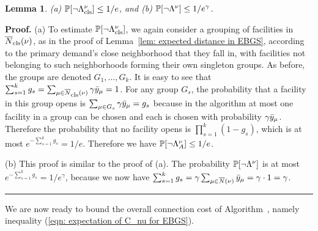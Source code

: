 \documentclass[oneside,final]{ucr}
\newtheorem{lemma}[theorem]{Lemma}
\newenvironment{proof}[1][Proof]{\textbf{#1.} }{\ \rule{0.5em}{0.5em}}
\begin{document}
\begin{lemma}\label{lem: close and far neighbor probability}
{\rm (a)} $\mathbb{P}[\neg\Lambda^\nu_{{\mbox{\scriptsize\rm cls}}}] \le 1/e$, and
{\rm (b)} $\mathbb{P}[\neg\Lambda^\nu] \le 1/e^\gamma$.
\end{lemma}
\begin{proof}
  (a) To estimate $\mathbb{P}[\neg\Lambda^\nu_{{\mbox{\scriptsize\rm cls}}}]$, we again consider a
  grouping of facilities in ${\overline{N}}_{{\mbox{\scriptsize\rm cls}}}(\nu)$, as in the proof of
  Lemma~\ref{lem: expected distance in EBGS}, according to the primary
  demand's close neighborhood that they fall in, with facilities not
  belonging to such neighborhoods forming their own singleton groups.
  As before, the groups are denoted $G_1, \ldots, G_k$. It is easy to
  see that $\sum_{s=1}^k g_s = \sum_{\mu \in {\overline{N}}_{{\mbox{\scriptsize\rm cls}}}(\nu)} \gamma
  {\bar y}_{\mu} = 1$. For any group $G_s$, the probability that a
  facility in this group opens is $\sum_{\mu \in G_s} \gamma
  {\bar y}_{\mu} = g_s$ because in the algorithm at most one facility in
  a group can be chosen and each is chosen with probability $\gamma
  {\bar y}_{\mu}$. Therefore the probability that no facility 
  opens is $\prod_{s=1}^k (1 - g_s)$, which is
  at most $e^{-\sum_{s=1}^k g_s} = 1/e$. Therefore we have
  $\mathbb{P}[\neg\Lambda^\nu_A] \leq 1/e$.

(b)
  This proof is similar to the proof of (a). The probability $\mathbb{P}[\neg\Lambda^\nu]$ is at most
  $e^{-\sum_{s=1}^k g_s} = 1/e^\gamma$, because we now have
  $\sum_{s=1}^k g_s = \gamma \sum_{\mu \in {\overline{N}}(\nu)} {\bar y}_{\mu} =
  \gamma \cdot 1 = \gamma$.
\end{proof}


We are now ready to bound the overall connection cost of
Algorithm~{\EBGS}, namely inequality (\ref{eqn: expectation of C_nu for EBGS}).

\end{document}
